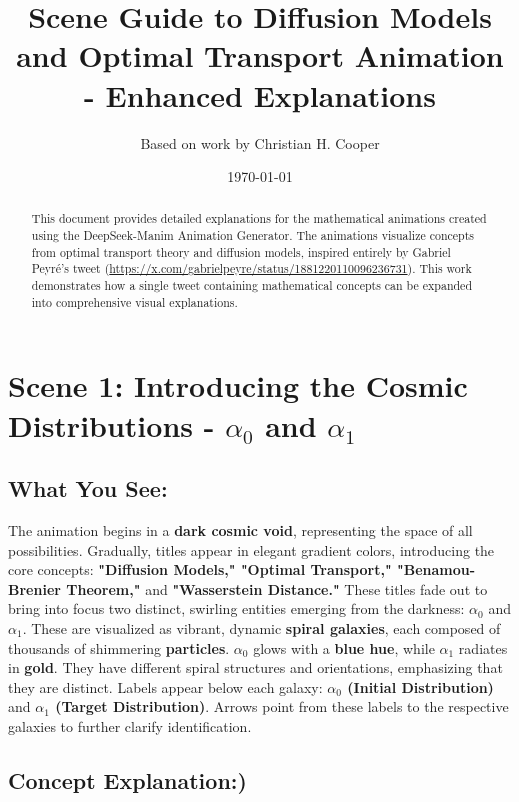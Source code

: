 \documentclass{article}
\title{Scene Guide to Diffusion Models and Optimal Transport Animation - Enhanced Explanations}
\author{Based on work by Christian H. Cooper}
\date{\today}
\begin{document}
\maketitle

\begin{abstract}
This document provides detailed explanations for the mathematical animations created using the DeepSeek-Manim Animation Generator. The animations visualize concepts from optimal transport theory and diffusion models, inspired entirely by Gabriel Peyré's tweet (\url{https://x.com/gabrielpeyre/status/1881220110096236731}). This work demonstrates how a single tweet containing mathematical concepts can be expanded into comprehensive visual explanations.
\end{abstract}

\section*{Scene 1: Introducing the Cosmic Distributions - \( \alpha_0 \) and \( \alpha_1 \)}

\subsection*{What You See:}

The animation begins in a \textbf{dark cosmic void}, representing the space of all possibilities. Gradually, titles appear in elegant gradient colors, introducing the core concepts: \textbf{"Diffusion Models," "Optimal Transport," "Benamou-Brenier Theorem,"} and \textbf{"Wasserstein Distance."} These titles fade out to bring into focus two distinct, swirling entities emerging from the darkness: \textbf{\( \alpha_0 \)} and \textbf{\( \alpha_1 \)}. These are visualized as vibrant, dynamic \textbf{spiral galaxies}, each composed of thousands of shimmering \textbf{particles}. \( \alpha_0 \) glows with a \textbf{blue hue}, while \( \alpha_1 \) radiates in \textbf{gold}. They have different spiral structures and orientations, emphasizing that they are distinct.  Labels appear below each galaxy: \textbf{\( \alpha_0 \) (Initial Distribution)} and \textbf{\( \alpha_1 \) (Target Distribution)}. Arrows point from these labels to the respective galaxies to further clarify identification.

\subsection*{Concept Explanation:)}
\end{document}
